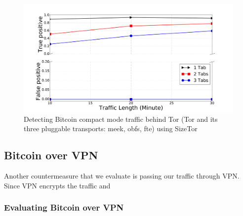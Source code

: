 \begin{figure}
\centering
\includegraphics[scale=0.15]{image/jan25/sizeTor-multiTab.pdf}%
\caption{Detecting Bitcoin compact mode traffic behind Tor (Tor and its three pluggable transports: meek, obfs, fte) using SizeTor}
\label{fig:tor_sizeTor}
\end{figure}

\iffalse
\subsection{Bitcoin over VPN}
Another countermeasure that we evaluate is passing our traffic through VPN. Since VPN encrypts the traffic and 
\subsubsection{Evaluating Bitcoin over VPN}


